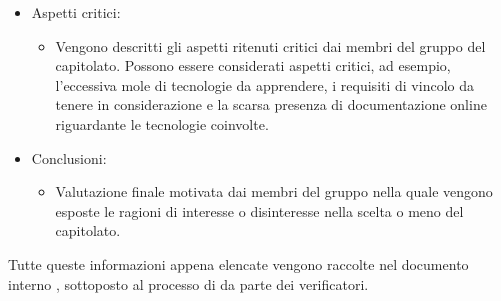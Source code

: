 \begin{itemize}
\begin{itemize}
	\end{itemize}
\item Aspetti critici:
	\begin{itemize}
	\item Vengono descritti gli aspetti ritenuti critici dai membri del gruppo \Gruppo{} del capitolato.
	Possono essere considerati aspetti critici, ad esempio, l'eccessiva mole di tecnologie da apprendere, i requisiti di vincolo da tenere in considerazione e la scarsa presenza di documentazione online riguardante le tecnologie coinvolte.
	\end{itemize}
\item Conclusioni:
	\begin{itemize}
	\item Valutazione finale motivata dai membri del gruppo \Gruppo{} nella quale vengono esposte le ragioni di interesse o disinteresse nella scelta o meno del capitolato.
	\end{itemize}
\end{itemize}
Tutte queste informazioni appena elencate vengono raccolte nel documento interno \glo{\SdF{}}, sottoposto al processo di  da parte dei verificatori.
